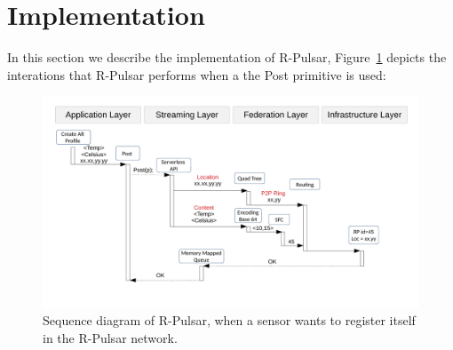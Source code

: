 
\section{Implementation}

In this section we describe the implementation of R-Pulsar, Figure~\ref{fig:diagram} depicts the interations that R-Pulsar performs when a the Post primitive is used:

\begin{figure}[htb!]
  \centering
  \hspace*{-2cm}   
    \includegraphics[width=1.2\textwidth]{Figures/Diagram.pdf}
  \caption{Sequence diagram of R-Pulsar, when a sensor wants to register itself in the R-Pulsar network.} \label{fig:diagram}
\end{figure}

